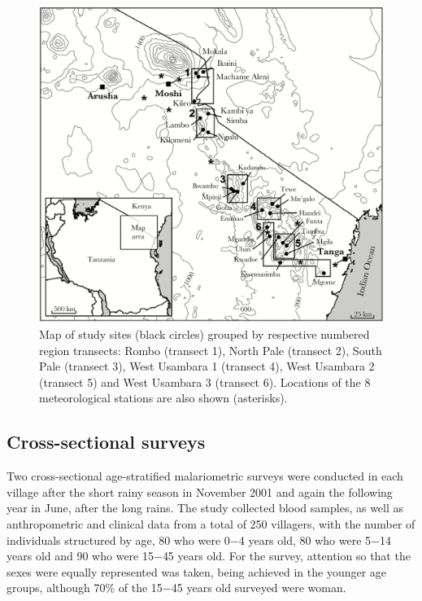 \begin{figure}[ht!]
\center
\includegraphics[width=13cm]{images/site_map.jpeg}
\caption[Map of study sites]{Map of study sites (black circles) grouped by respective numbered region transects: Rombo (transect 1), North Pale (transect 2), South Pale (transect 3), West Usambara 1 (transect 4), West Usambara 2 (transect 5) and West Usambara 3 (transect 6). Locations of the 8 meteorological stations are also shown (asterisks).}
\label{fig:2.1}
\end{figure}

\subsection{Cross-sectional surveys}

Two cross-sectional age-stratified malariometric surveys were conducted in each village after the short rainy season in November 2001 and again the following year in June, after the long rains. The study collected blood samples, as well as anthropometric and clinical data from a total of 250 villagers, with the number of individuals structured by age, 80 who were 0$-$4 years old, 80 who were 5$-$14 years old and 90 who were 15$-$45 years old. For the survey, attention so that the sexes were equally represented was taken, being achieved in the younger age groups, although 70\% of the 15$-$45 years old surveyed were woman.

